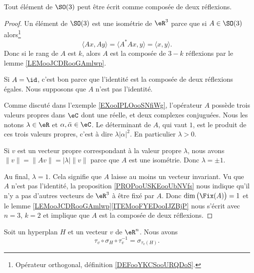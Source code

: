 \begin{corollary}       \label{CORooJCURooSRzSFb}
    Tout élément de \( \SO(3)\) peut être écrit comme composée de deux réflexions.
\end{corollary}

\begin{proof}
    Un élément de \( \SO(3)\) est une isométrie de \( \eR^3\) parce que si \( A\in\SO(3)\) alors\footnote{Opérateur orthogonal, définition \ref{DEFooYKCSooURQDoS}.}
    \begin{equation}
        \langle Ax, Ay\rangle =\langle A^*Ax, y\rangle =\langle x, y\rangle .
    \end{equation}
    Donc si le rang de \( A\) est \( k\), alors \( A\) est la composée de \( 3-k\) réflexions par le lemme \ref{LEMooJCDRooGAmlwp}.

    Si \( A=\id\), c'est bon parce que l'identité est la composée de deux réflexions égales. Nous supposons que \( A\) n'est pas l'identité.

    Comme discuté dans l'exemple \ref{EXooIPLOooSNfiWg}, l'opérateur \( A\) possède trois valeurs propres dans \( \eC\) dont une réelle, et deux complexes conjuguées. Nous les notons \( \lambda\in \eR\) et \( \alpha,\bar \alpha\in \eC\). Le déterminant de \( A\), qui vaut \( 1\), est le produit de ces trois valeurs propres, c'est à dire \( \lambda| \alpha |^2\). En particulier \( \lambda>0\).

    Si \( v\) est un vecteur propre correspondant à la valeur propre \( \lambda\), nous avons \(  \| v \|= \| Av \|=| \lambda |\| v \|\) parce que \( A\) est une isométrie. Donc \( \lambda=\pm 1\).

    Au final, \( \lambda=1\). Cela signifie que \( A\) laisse au moins un vecteur invariant. Vu que \( A\) n'est pas l'identité, la proposition \ref{PROPooUSKEooUbNVfs} nous indique qu'il n'y a pas d'autres vecteurs de \( \eR^3\) à être fixé par \( A\). Donc \( \dim\big( \Fix(A) \big)=1\) et le lemme \ref{LEMooJCDRooGAmlwp}\ref{ITEMooFYEDooIJZBjP} nous s'écrit avec \( n=3\), \( k=2\) et implique que \( A\) est la composée de deux réflexions.
\end{proof}

\begin{lemma}       \label{LEMooMCVKooKzmlAg}
    Soit un hyperplan \( H\) et un vecteur \( v\) de \( \eR^n\). Nous avons
    \begin{equation}
        \tau_v\circ \sigma_H\circ\tau_v^{-1}=\sigma_{\tau_v(H)}.
    \end{equation}
\end{lemma}


